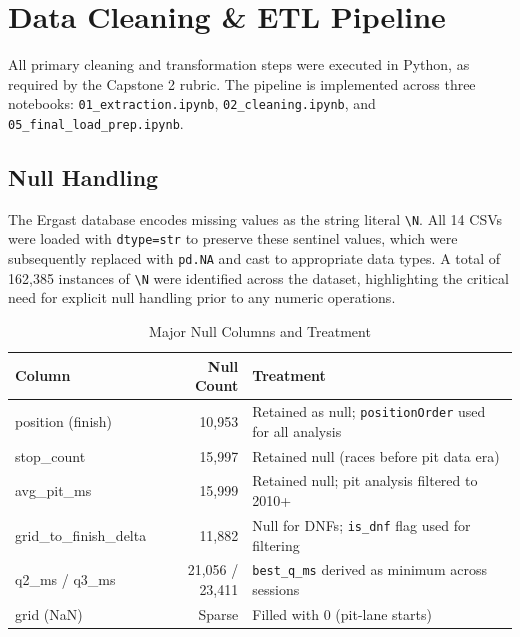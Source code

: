 \documentclass[12pt, a4paper]{article}
\begin{document}
\section{Data Cleaning \& ETL Pipeline}

All primary cleaning and transformation steps were executed in Python, as required by the Capstone 2 rubric. The pipeline is implemented across three notebooks: \texttt{01\_extraction.ipynb}, \texttt{02\_cleaning.ipynb}, and \texttt{05\_final\_load\_prep.ipynb}.

\subsection{Null Handling}
The Ergast database encodes missing values as the string literal \texttt{\textbackslash N}. All 14 CSVs were loaded with \texttt{dtype=str} to preserve these sentinel values, which were subsequently replaced with \texttt{pd.NA} and cast to appropriate data types. A total of 162,385 instances of \texttt{\textbackslash N} were identified across the dataset, highlighting the critical need for explicit null handling prior to any numeric operations.

\begin{table}[H]
\centering
\caption{Major Null Columns and Treatment}
\begin{tabular}{l r l}
\toprule
\textbf{Column} & \textbf{Null Count} & \textbf{Treatment} \\
\midrule
position (finish)       & 10,953 & Retained as null; \texttt{positionOrder} used for all analysis \\
stop\_count             & 15,997 & Retained null (races before pit data era) \\
avg\_pit\_ms            & 15,999 & Retained null; pit analysis filtered to 2010+ \\
grid\_to\_finish\_delta & 11,882 & Null for DNFs; \texttt{is\_dnf} flag used for filtering \\
q2\_ms / q3\_ms         & 21,056 / 23,411 & \texttt{best\_q\_ms} derived as minimum across sessions \\
grid (NaN)              & Sparse & Filled with 0 (pit-lane starts) \\
\bottomrule
\end{tabular}
\end{table}
\end{document}
